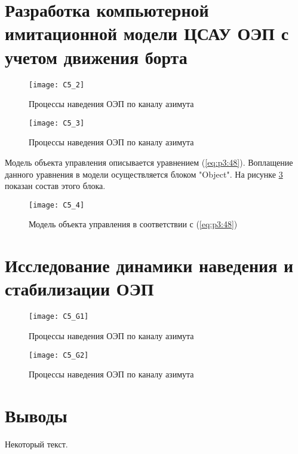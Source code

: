 \section{Разработка компьютерной имитационной модели ЦСАУ ОЭП с учетом  движения борта} \label{ch:ch5/sect3}



\begin{figure}[ht]
	\centering
	\texttt{[image: C5\_2]} 
	\caption{Процессы наведения ОЭП по каналу азимута}
	\label{fig:az_true}
\end{figure}

\begin{figure}[ht]
	\centering
	\texttt{[image: C5\_3]} 
	\caption{Процессы наведения ОЭП по каналу азимута}
	\label{fig:az_true}
\end{figure}

 Модель объекта управления описывается уравнением (\ref{eq:p3:48}). Воплащение данного уравнения в модели осуществляется блоком "Object". На рисунке \ref{fig:object} показан состав этого блока.
\begin{figure}[ht]
	\centering
	\texttt{[image: C5\_4]} 
	\caption{Модель объекта управления в соответствии с (\ref{eq:p3:48})}
	\label{fig:object}
\end{figure}



\section{Исследование динамики наведения и стабилизации ОЭП} \label{ch:ch5/sect4}
\begin{figure}[ht]
	\centering
	\texttt{[image: C5\_G1]} 
	\caption{Процессы наведения ОЭП по каналу азимута}
	\label{fig:az_true}
\end{figure}
\begin{figure}[ht]
	\centering
	\texttt{[image: C5\_G2]} 
	\caption{Процессы наведения ОЭП по каналу азимута}
	\label{fig:az_true}
\end{figure}
\section{Выводы} \label{ch:ch5/sect5}
	


Некоторый текст.

\clearpage